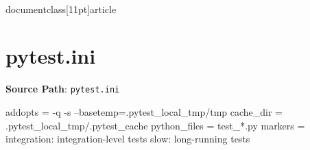 \\documentclass[11pt]{article}
\begin{document}
\section*{pytest.ini}
\textbf{Source Path}: \texttt{pytest.ini}\par
\bigskip
\begin{CodeBlock}
[pytest]
addopts = -q -s --basetemp=.pytest_local_tmp/tmp
cache_dir = .pytest_local_tmp/.pytest_cache
python_files = test_*.py
markers =
    integration: integration-level tests
    slow: long-running tests

\end{CodeBlock}
\end{document}
